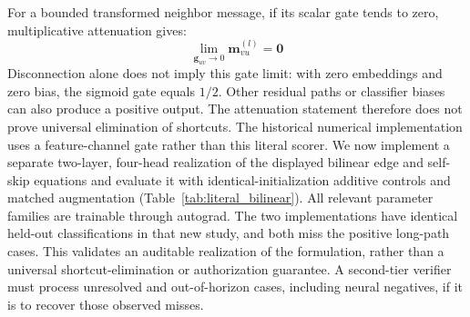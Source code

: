 \begin{proposition}
For a bounded transformed neighbor message, if its scalar gate tends to zero, multiplicative attenuation gives:
\begin{equation}
\lim_{\mathbf{g}_{uv} \to 0} \mathbf{m}_{vu}^{(l)} = \mathbf{0}
\end{equation}
Disconnection alone does not imply this gate limit: with zero embeddings and zero bias, the sigmoid gate equals $1/2$. Other residual paths or classifier biases can also produce a positive output. The attenuation statement therefore does not prove universal elimination of shortcuts. The historical numerical implementation uses a feature-channel gate rather than this literal scorer. We now implement a separate two-layer, four-head realization of the displayed bilinear edge and self-skip equations and evaluate it with identical-initialization additive controls and matched augmentation (Table~\ref{tab:literal_bilinear}). All relevant parameter families are trainable through autograd. The two implementations have identical held-out classifications in that new study, and both miss the positive long-path cases. This validates an auditable realization of the formulation, rather than a universal shortcut-elimination or authorization guarantee. A second-tier verifier must process unresolved and out-of-horizon cases, including neural negatives, if it is to recover those observed misses.
\end{proposition}
